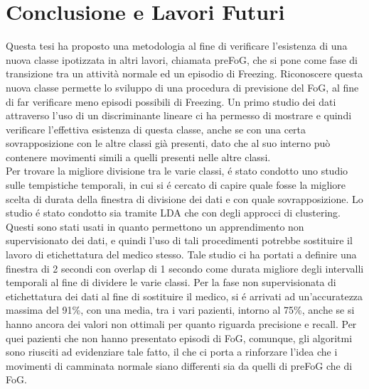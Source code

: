 
\chapter{Conclusione e Lavori Futuri}\label{chap9:Concl}
Questa tesi ha proposto una metodologia al fine di verificare l'esistenza di una nuova classe ipotizzata in altri lavori, chiamata preFoG, che si pone come fase di transizione tra un attività normale ed un episodio di Freezing. Riconoscere questa nuova classe permette lo sviluppo di una procedura di previsione del FoG, al fine di far verificare meno episodi possibili di Freezing. Un primo studio dei dati attraverso l'uso di un discriminante lineare ci ha permesso di mostrare e quindi verificare l'effettiva esistenza di questa classe, anche se con una certa sovrapposizione con le altre classi già presenti, dato che al suo interno può contenere movimenti simili a quelli presenti nelle altre classi.\\ 
Per trovare la migliore divisione tra le varie classi, é stato condotto uno studio sulle tempistiche temporali, in cui si é cercato di capire quale fosse la migliore scelta di durata della finestra di divisione dei dati e con quale sovrapposizione. Lo studio é stato condotto sia tramite LDA che con degli approcci di clustering. Questi sono stati usati in quanto permettono un apprendimento non supervisionato dei dati, e quindi l'uso di tali procedimenti potrebbe sostituire il lavoro di etichettatura del medico stesso. Tale studio ci ha portati a definire una finestra di 2 secondi con overlap di 1 secondo come durata migliore degli intervalli temporali al fine di dividere le varie classi. Per la fase non supervisionata di etichettatura dei dati al fine di sostituire il medico, si é arrivati ad un'accuratezza massima del 91\%, con una media, tra i vari pazienti, intorno al 75\%, anche se si hanno ancora dei valori non ottimali per quanto riguarda precisione e recall. Per quei pazienti che non hanno presentato episodi di FoG, comunque, gli algoritmi sono riusciti ad evidenziare tale fatto, il che ci porta a rinforzare l'idea che i movimenti di camminata normale siano differenti sia da quelli di preFoG che di FoG.\\
